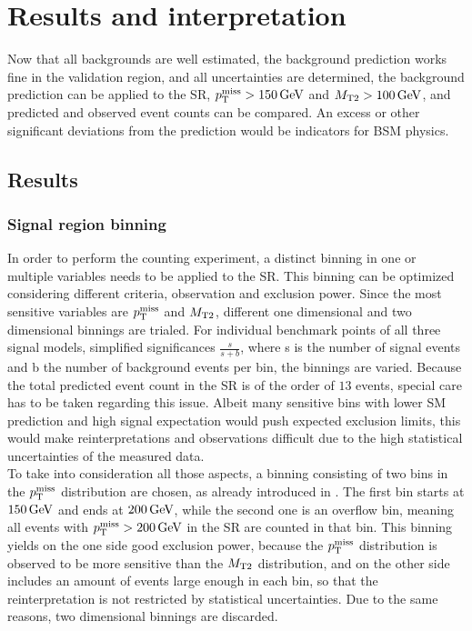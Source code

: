 \chapter{Results and interpretation}\label{chap:results}
Now that all backgrounds are well estimated, the background prediction works fine in the validation region, and all uncertainties are determined, the background prediction can be applied to the SR, $p_{\mathrm{T}}^\text{miss}>150\,\text{Ge\hspace{-.08em}V}$ and $M_{\mathrm{T2}}>100\,\text{Ge\hspace{-.08em}V}$, and predicted and observed event counts can be compared. An excess or other significant deviations from the prediction would be indicators for BSM physics.
\section{Results}\label{sec:results}
\subsection*{Signal region binning}
In order to perform the counting experiment, a distinct binning in one or multiple variables needs to be applied to the SR. This binning can be optimized considering different criteria, \eg observation and exclusion power. Since the most sensitive variables are $p_{\mathrm{T}}^\text{miss}$ and $M_{\mathrm{T2}}$, different one dimensional and two dimensional binnings are trialed. For individual benchmark points of all three signal models, simplified significances $\frac{s}{s+b}$, where s is the number of signal events and b the number of background events per bin, the binnings are varied. Because the total predicted event count in the SR is of the order of $13$ events, special care has to be taken regarding this issue. Albeit many sensitive bins with lower SM prediction and high signal expectation would push expected exclusion limits, this would make reinterpretations and observations difficult due to the high statistical uncertainties of the measured data.\\
To take into consideration all those aspects, a binning consisting of two bins in the $p_{\mathrm{T}}^\text{miss}$ distribution are chosen, as already introduced in . The first bin starts at $150\,\text{Ge\hspace{-.08em}V}$ and ends at $200\,\text{Ge\hspace{-.08em}V}$, while the second one is an overflow bin, meaning all events with $p_{\mathrm{T}}^\text{miss}>200\,\text{Ge\hspace{-.08em}V}$ in the SR are counted in that bin. This binning yields on the one side good exclusion power, because the $p_{\mathrm{T}}^\text{miss}$ distribution is observed to be more sensitive than the $M_{\mathrm{T2}}$ distribution, and on the other side includes an amount of events large enough in each bin, so that the reinterpretation is not restricted by statistical uncertainties. Due to the same reasons, two dimensional binnings are discarded.
